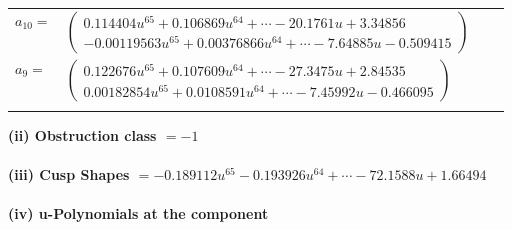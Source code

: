 \documentclass[1p]{elsarticle_modified}
\theoremstyle{definition}
\begin{document}
\begin{tabular}{m{7pt} m{180pt} m{7pt} m{180pt} }
\flushright $a_{10}=$&$\begin{pmatrix}0.114404 u^{65}+0.106869 u^{64}+\cdots-20.1761 u+3.34856\\-0.00119563 u^{65}+0.00376866 u^{64}+\cdots-7.64885 u-0.509415\end{pmatrix}$ \\
\flushright $a_{9}=$&$\begin{pmatrix}0.122676 u^{65}+0.107609 u^{64}+\cdots-27.3475 u+2.84535\\0.00182854 u^{65}+0.0108591 u^{64}+\cdots-7.45992 u-0.466095\end{pmatrix}$\\&\end{tabular}
\flushleft \textbf{(ii) Obstruction class $= -1$}\\~\\
\flushleft \textbf{(iii) Cusp Shapes $= -0.189112 u^{65}-0.193926 u^{64}+\cdots-72.1588 u+1.66494$}\\~\\
\newpage\renewcommand{\arraystretch}{1}
\flushleft \textbf{(iv) u-Polynomials at the component}\newline \\
\end{document}

